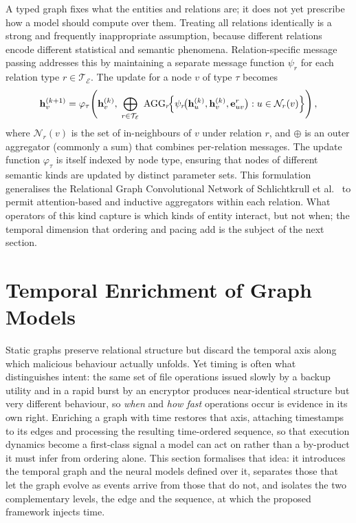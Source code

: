 \documentclass[%
    BCOR=10mm,
    DIV=13,
    toc=bibliography,
    toc=listof,
    oneside,
    12pt,
]{scrbook}
\begin{document}
A typed graph fixes what the entities and relations are; it does not yet prescribe
how a model should compute over them. Treating all relations identically is a
strong and frequently inappropriate assumption, because different relations encode
different statistical and semantic phenomena. Relation-specific message passing addresses this by
maintaining a separate message function $\psi_r$ for each relation type
$r \in \mathcal{T}_\mathcal{E}$. The update for a node $v$ of type $\tau$
becomes
\begin{equation}
  \mathbf{h}_v^{(k+1)} = \varphi_\tau\!\left(
    \mathbf{h}_v^{(k)},\;
    \bigoplus_{r \in \mathcal{T}_\mathcal{E}}\;
    \mathrm{AGG}_r\!\Bigl\{
      \psi_r\!\bigl(\mathbf{h}_u^{(k)}, \mathbf{h}_v^{(k)}, \mathbf{e}_{uv}^{r}\bigr) :
      u \in \mathcal{N}_r(v)
    \Bigr\}
  \right),
  \label{eq:hetero_agg}
\end{equation}
where $\mathcal{N}_r(v)$ is the set of in-neighbours of $v$ under relation
$r$, and $\oplus$ is an outer aggregator (commonly a sum) that combines
per-relation messages. The update function $\varphi_\tau$ is itself indexed by
node type, ensuring that nodes of different semantic kinds are updated by
distinct parameter sets. This formulation generalises the Relational Graph
Convolutional Network of Schlichtkrull et al.~\cite{schlichtkrull2018} to
permit attention-based and inductive aggregators within each relation. What
operators of this kind capture is which kinds of entity interact, but not when;
the temporal dimension that ordering and pacing add is the subject of the next
section.

\section{Temporal Enrichment of Graph Models}
\label{sec:temporal_graph}

Static graphs preserve relational structure but discard the temporal axis along
which malicious behaviour actually unfolds. Yet timing is often what
distinguishes intent: the same set of file operations issued slowly by a backup
utility and in a rapid burst by an encryptor produces near-identical structure
but very different behaviour, so \emph{when} and \emph{how fast} operations occur
is evidence in its own right. Enriching a graph with time restores that axis,
attaching timestamps to its edges and processing the resulting
time-ordered sequence, so that execution dynamics become a first-class signal a
model can act on rather than a by-product it must infer from ordering alone. This
section formalises that idea: it introduces the temporal graph and the neural
models defined over it, separates those that let the graph evolve as events
arrive from those that do not, and isolates the two complementary levels, the
edge and the sequence, at which the proposed framework injects time.
\end{document}

